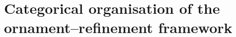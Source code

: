 \chapter{Categorical organisation of the ornament--refinement framework}
\label{chapter:categories}
